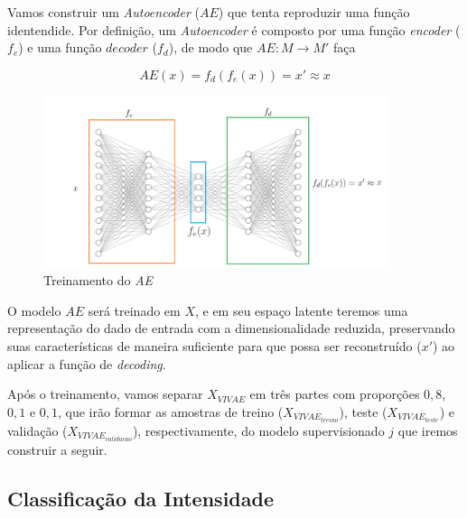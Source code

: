 Vamos construir um \textit{Autoencoder} ($AE$) que tenta reproduzir uma função identendide. Por definição, um \textit{Autoencoder} é composto por uma função \textit{encoder} ($f_e$) e uma função $decoder$ ($f_d$), de modo que $AE: M \rightarrow M'$ faça

\begin{equation}
    AE(x) = f_d(f_e(x)) = x' \approx x
\end{equation}

\begin{figure}[!h]
\centering
\includegraphics[width=0.9\textwidth]{imagens/p-autoencoder.png}
\caption{\label{fig:treinamentoae}Treinamento do \textit{AE}}
\end{figure}

O modelo $AE$ será treinado em $X$, e em seu espaço latente teremos uma representação do dado de entrada com a dimensionalidade reduzida, preservando suas características de maneira suficiente para que possa ser reconstruído ($x'$) ao aplicar a função de \textit{decoding}.

Após o treinamento, vamos separar $X_{VIVAE}$ em três partes com proporções $0,8$, $0,1$ e $0,1$, que irão formar as amostras de treino ($X_{VIVAE_{treino}}$), teste ($X_{VIVAE_{teste}}$) e validação ($X_{VIVAE_{validacao}}$), respectivamente, do modelo supervisionado $j$ que iremos construir a seguir.


\subsection{Classificação da Intensidade}

